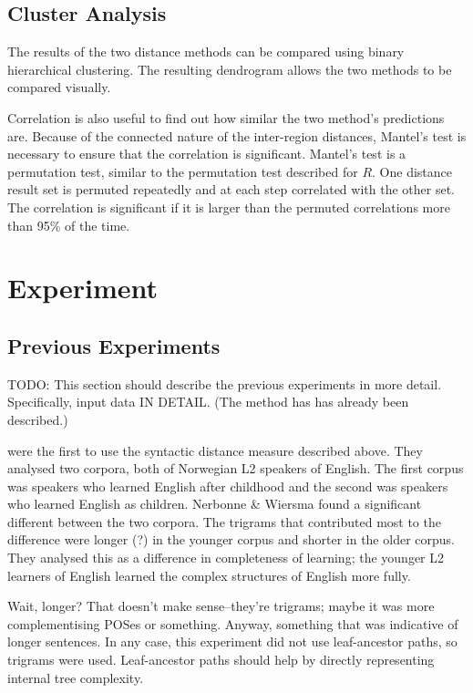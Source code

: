 \documentclass[11pt]{article}
\begin{document}
\subsection{Cluster Analysis}

The results of the two distance methods can be compared using
binary hierarchical clustering. The resulting dendrogram allows the two
methods to be compared visually.

Correlation is also useful to find out how similar the two method's
predictions are. Because of the connected nature of the inter-region
distances, Mantel's test is necessary to ensure that the correlation
is significant. Mantel's test is a permutation test, similar to the
permutation test described for $R$. One distance result set is
permuted repeatedly and at each step correlated with the other
set. The correlation is significant if it is larger than the permuted
correlations more than 95\% of the time.

\section{Experiment}

\subsection{Previous Experiments}

TODO: This section should describe the previous experiments in more
detail. Specifically, input data IN DETAIL. (The method has has
already been described.)

 were the first to use the syntactic
distance measure described above. They analysed two corpora, both of
Norwegian L2 speakers of English. The first corpus was speakers who
learned English after childhood and the second was speakers who learned
English as children. Nerbonne \& Wiersma found a significant different
between the two corpora. The trigrams that contributed most to the
difference were longer (?) in the younger corpus and shorter in the
older corpus. They analysed this as a difference in completeness of
learning; the younger L2 learners of English learned the complex
structures of English more fully.

Wait, longer? That doesn't make sense--they're trigrams; maybe it was more
complementising POSes or something. Anyway, something that was
indicative of longer sentences. In any case, this experiment did not
use leaf-ancestor paths, so trigrams were used. Leaf-ancestor paths
should help by directly representing internal tree complexity.
\end{document}
